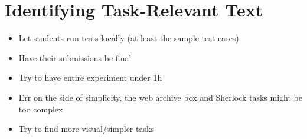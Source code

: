 \setcounter{chapter}{5}
\setcounter{rq}{1}


\chapter{Identifying Task-Relevant Text}
\label{ch:assisting}






\begin{itemize}
    \item Let students run tests locally (at least the sample test cases)
    \item Have their submissions be final
    \item Try to have entire experiment under 1h
    \item Err on the side of simplicity, the web archive box and Sherlock tasks might be too complex
    \item Try to find more visual/simpler tasks
\end{itemize}

